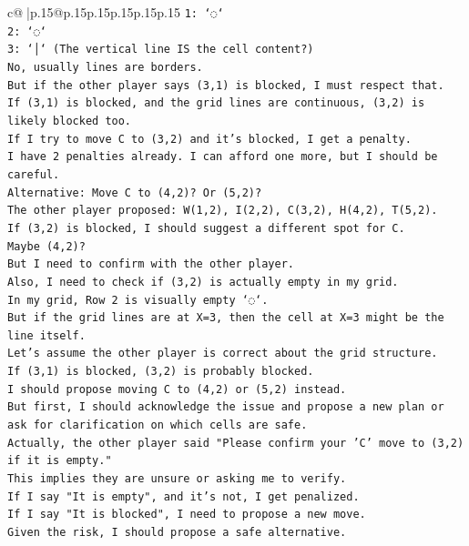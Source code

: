 \documentclass{article}
\begin{document}
{\begin{supertabular}{c@{$\;$}|p{.15\linewidth}@{}p{.15\linewidth}p{.15\linewidth}p{.15\linewidth}p{.15\linewidth}p{.15\linewidth}}
{{{\texttt{1: `◌`} \\
\texttt{2: `◌`} \\
\texttt{3: `│` (The vertical line IS the cell content?)} \\
\texttt{No, usually lines are borders.} \\
\texttt{But if the other player says (3,1) is blocked, I must respect that.} \\
\texttt{If (3,1) is blocked, and the grid lines are continuous, (3,2) is likely blocked too.} \\
\texttt{If I try to move C to (3,2) and it's blocked, I get a penalty.} \\
\texttt{I have 2 penalties already. I can afford one more, but I should be careful.} \\
\texttt{Alternative: Move C to (4,2)? Or (5,2)?} \\
\texttt{The other player proposed: W(1,2), I(2,2), C(3,2), H(4,2), T(5,2).} \\
\texttt{If (3,2) is blocked, I should suggest a different spot for C.} \\
\texttt{Maybe (4,2)?} \\
\texttt{But I need to confirm with the other player.} \\
\texttt{Also, I need to check if (3,2) is actually empty in my grid.} \\
\texttt{In my grid, Row 2 is visually empty `◌`.} \\
\texttt{But if the grid lines are at X=3, then the cell at X=3 might be the line itself.} \\
\texttt{Let's assume the other player is correct about the grid structure.} \\
\texttt{If (3,1) is blocked, (3,2) is probably blocked.} \\
\texttt{I should propose moving C to (4,2) or (5,2) instead.} \\
\texttt{But first, I should acknowledge the issue and propose a new plan or ask for clarification on which cells are safe.} \\
\texttt{Actually, the other player said "Please confirm your 'C' move to (3,2) if it is empty."} \\
\texttt{This implies they are unsure or asking me to verify.} \\
\texttt{If I say "It is empty", and it's not, I get penalized.} \\
\texttt{If I say "It is blocked", I need to propose a new move.} \\
\texttt{Given the risk, I should propose a safe alternative.} \\
}}}
\end{supertabular}}
\end{document}
